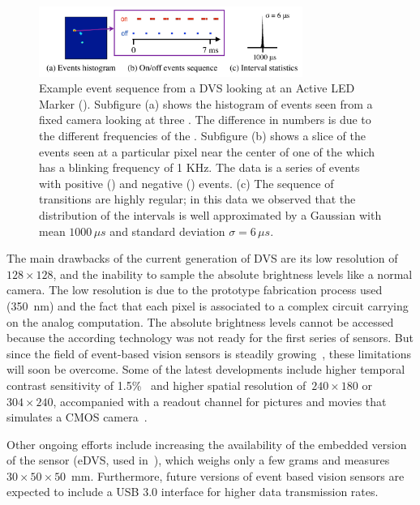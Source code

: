 \begin{figure}[b]
\centering{}\includegraphics[bb=12bp 0bp 500bp 135bp,clip,width=8.6cm]{figures/slides/event_sequence2}\caption{\label{fig:events-hist}Example event sequence from a DVS looking
at an Active LED Marker (\ALM). Subfigure (a) shows the histogram
of events seen from a fixed camera looking at three \ALMs. The difference
in numbers is due to the different frequencies of the \ALMs. Subfigure
(b) shows a slice of the events seen at a particular pixel near the
center of one of the \ALMs which has a blinking frequency of 1 KHz.
The data is a series of events with positive (\pP) and negative (\pN)
events. (c) The sequence of \pPN transitions are highly regular;
in this data we observed that the distribution of the intervals is
well approximated by a Gaussian with mean $1000\,\mu s$ and standard
deviation $\sigma=6\,\mu s$. }
\end{figure}


The main drawbacks of the current generation of DVS are its low resolution
of $128\times128$, and the inability to sample the absolute brightness
levels like a normal camera. The low resolution is due to the prototype
fabrication process used (350~nm) and the fact that each pixel is
associated to a complex circuit carrying on the analog computation.
The absolute brightness levels cannot be accessed because the according
technology was not ready for the first series of sensors. But since
the field of event-based vision sensors is steadily growing~\cite{delbruck10activity},
these limitations will soon be overcome. Some of the latest developments
include higher temporal contrast sensitivity of 1.5\%~\cite{serrano13128}
and higher spatial resolution of~$240\times180$ or~$304\times240$,
accompanied with a readout channel for pictures and movies that simulates
a CMOS camera~\cite{posch11qvga,berner13240}. 

Other ongoing efforts include increasing the availability of the embedded
version of the sensor (eDVS, used in~\cite{conradt09pencil}), which
weighs only a few grams and measures~$30\times50\times50$~mm. Furthermore,
future versions of event based vision sensors are expected to include
a USB 3.0 interface for higher data transmission rates.
